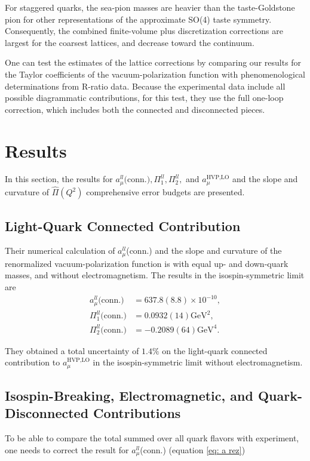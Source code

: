 \documentclass[amsfonts, amssymb, amsmath, preprint, showkeys, nofootinbib,longbibliography]{revtex4-1}
\begin{document}
For staggered quarks, the sea-pion masses are heavier than the taste-Goldstone pion for other representations of the approximate SO(4) taste symmetry.
Consequently, the combined finite-volume plus discretization corrections are largest for the coarsest lattices, and decrease toward the continuum.

One can test the estimates of the lattice corrections by comparing our results for the Taylor coefficients of the vacuum-polarization function with phenomenological determinations from R-ratio data.
Because the experimental data include all possible diagrammatic contributions, for this test, they use the full one-loop correction, which includes both the connected and disconnected pieces.

\section{Results}
In this section, the results for $a_\mu^{ll}\text{(conn.)}, \Pi_1^{ll} , \Pi_2^{ll} ,$ and $a_\mu^{\text{HVP,LO}}$ and the slope and curvature of $\hat{\Pi}(Q^2)$ comprehensive error budgets are presented.

\subsection{Light-Quark Connected Contribution}

Their numerical calculation of $a_\mu^{ll}$(conn.) and the slope and curvature of the renormalized vacuum-polarization function is with equal up- and down-quark masses, and without electromagnetism.
The results in the isospin-symmetric limit are
\begin{align}
	a_\mu^{ll} \text{(conn.)} &= 637.8(8.8) \times 10^{-10},\label{eq: a rez}\\
	\Pi_1^{ll} \text{(conn.)} &= 0.0932(14) \text{GeV}^2,\\
	\Pi_2^{ll} \text{(conn.)} &= -0.2089(64) \text{GeV}^4.
\end{align}

They obtained a total uncertainty of $1.4\%$ on the light-quark connected contribution to $a_\mu^{\text{HVP,LO}}$ in the isospin-symmetric limit without electromagnetism.

\subsection{Isospin-Breaking, Electromagnetic, and Quark-Disconnected Contributions}
To be able to compare the total summed over all quark flavors with experiment, one needs to correct the result for $a_\mu^{ll}$(conn.) (equation \ref{eq: a rez})
\end{document}

